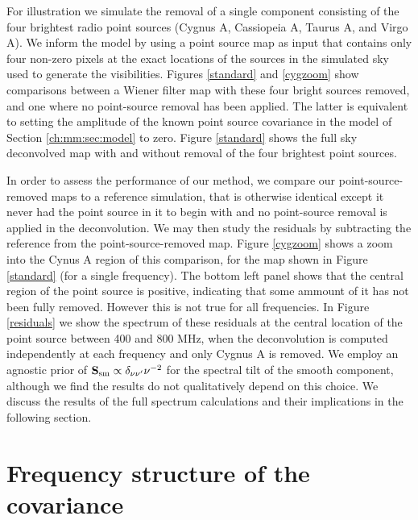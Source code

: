 For illustration we simulate the removal of a single component consisting of the four brightest radio point sources (Cygnus A, Cassiopeia A, Taurus A, and Virgo A). We inform the model by using a point source map as input that contains only four non-zero pixels at the exact locations of the sources in the simulated sky used to generate the visibilities. Figures \ref{standard} and \ref{cygzoom} show comparisons between a Wiener filter map with these four bright sources removed, and one where no point-source removal has been applied. The latter is equivalent to setting the amplitude of the known point source covariance in the model of Section \ref{ch:mm:sec:model} to zero. Figure \ref{standard} shows the full sky deconvolved map with and without removal of the four brightest point sources. 

In order to assess the performance of our method, we compare our point-source-removed maps to a reference simulation, that is otherwise identical except it never had the point source in it to begin with and no point-source removal is applied in the deconvolution. We may then study the residuals by subtracting the reference from the point-source-removed map. Figure \ref{cygzoom} shows a zoom into the Cynus A region of this comparison, for the map shown in Figure \ref{standard} (for a single frequency). The bottom left panel shows that the central region of the point source is positive, indicating that some ammount of it has not been fully removed. However this is not true for all frequencies. In Figure \ref{residuals} we show the spectrum of these residuals at the central location of the point source between 400 and 800 MHz, when the deconvolution is computed independently at each frequency and only Cygnus A is removed. We employ an agnostic prior of $\mathbf{S}_{\rm sm} \propto \delta_{\nu\nu'}\nu^{-2}$ for the spectral tilt of the smooth component, although we find the results do not qualitatively depend on this choice. We discuss the results of the full spectrum calculations and their implications in the following section.


\section{Frequency structure of the covariance}
\label{ch:mm:sec:freq}

